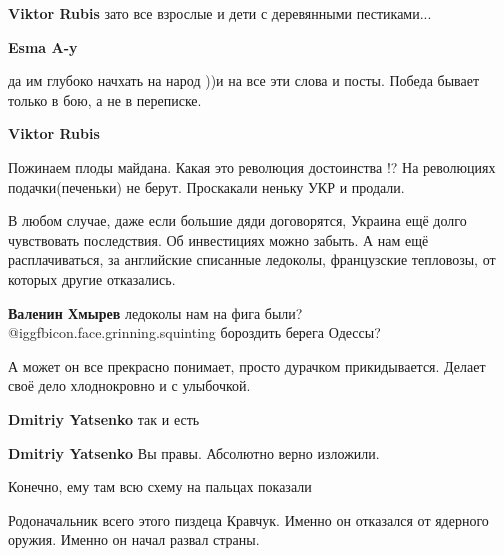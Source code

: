\begin{itemize}
\begin{itemize}
\textbf{Viktor Rubis} зато все взрослые и дети с деревянными пестиками...

\textbf{Esma A-y} 

да им глубоко начхать на народ ))и на все эти слова и посты. Победа бывает
только в бою, а не в переписке.

\textbf{Viktor Rubis} 

Пожинаем плоды майдана. Какая это революция достоинства !? На революциях
подачки(печеньки) не берут. Проскакали неньку УКР и продали.
\end{itemize} %


В любом случае, даже если большие дяди договорятся, Украина ещё долго чувствовать
последствия. Об инвестициях можно забыть. А нам ещё расплачиваться, за английские
списанные ледоколы, французские тепловозы, от которых другие отказались.

\textbf{Валенин Хмырев} ледоколы нам на фига были?  @igg{fbicon.face.grinning.squinting}  бороздить берега Одессы?


А может он все прекрасно понимает, просто дурачком прикидывается. Делает своё
дело хлоднокровно и с улыбочкой.

\begin{itemize} %
\textbf{Dmitriy Yatsenko} так и есть

\textbf{Dmitriy Yatsenko} Вы правы. Абсолютно верно изложили.

Конечно, ему там всю схему на пальцах показали
\end{itemize} %


Родоначальник всего этого пиздеца Кравчук. Именно он отказался от ядерного
оружия. Именно он начал развал страны.

\end{itemize} %
